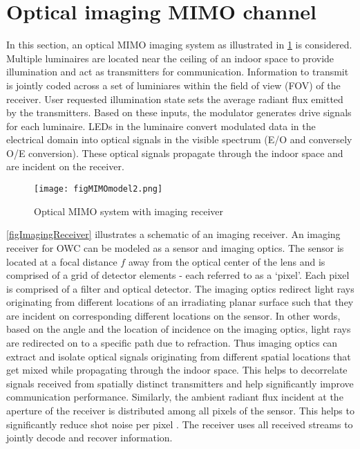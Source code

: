 
\section{Optical imaging MIMO channel}
\label{sec:mimoImagingChannel}

\graphicspath{{_MIMOSpace/figures_mimoImg/}}
In this section, an optical MIMO imaging system as illustrated in \figurename{ \ref{figMIMOblock}} is considered. Multiple luminaires are located near the ceiling of an indoor space to provide illumination and act as transmitters for communication. Information to transmit is jointly coded across a set of luminiares within the field of view (FOV) of the receiver. User requested illumination state sets the average radiant flux emitted by the transmitters. Based on these inputs, the modulator generates drive signals for each luminaire. LEDs in the luminaire convert modulated data in the electrical domain into optical signals in the visible spectrum (E/O and conversely O/E conversion). These optical signals propagate through the indoor space and are incident on the receiver. 

\begin{figure}[!t]
	\centering
		\texttt{[image: figMIMOmodel2.png]}
	\caption{Optical MIMO system with imaging receiver}
	\label{figMIMOblock}
\end{figure}

\figurename{ \ref{figImagingReceiver}} illustrates a schematic of an imaging receiver. An imaging receiver for OWC can be modeled as a sensor and imaging optics. The sensor is located at a focal distance $f$ away from the optical center of the lens and is comprised of a grid of detector elements - each referred to as a `pixel'. Each pixel is comprised of a filter and optical detector. The imaging optics redirect light rays originating from different locations of an irradiating planar surface such that they are incident on corresponding different locations on the sensor. In other words, based on the angle and the location of incidence on the imaging optics, light rays are redirected on to a specific path due to refraction. Thus imaging optics can extract and isolate optical signals originating from different spatial locations that get mixed while propagating through the indoor space. This helps to decorrelate signals received from spatially distinct transmitters and help significantly improve communication performance. Similarly, the ambient radiant flux incident at the aperture of the receiver is distributed among all pixels of the sensor. This helps to significantly reduce shot noise per pixel \cite{dja00a}. The receiver uses all received streams to jointly decode and recover information. 

